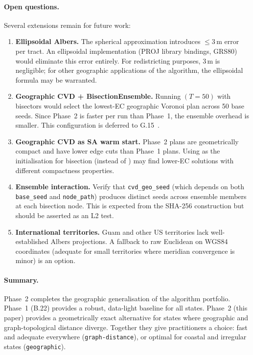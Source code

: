 \paragraph{Open questions.}
Several extensions remain for future work:

\begin{enumerate}
\item \textbf{Ellipsoidal Albers.}
  The spherical approximation introduces $\le 3$\,m error per tract.
  An ellipsoidal implementation (PROJ library bindings, GRS80) would
  eliminate this error entirely.
  For redistricting purposes, 3\,m is negligible; for other geographic
  applications of the algorithm, the ellipsoidal formula may be warranted.

\item \textbf{Geographic CVD + BisectionEnsemble.}
  Running \be{}$(T=50)$ with \cvdgeo{} bisectors would select the
  lowest-EC geographic Voronoi plan across 50 base seeds.
  Since Phase~2 is faster per run than Phase~1, the ensemble overhead
  is smaller.
  This configuration is deferred to G.15~\citep{dellaLibera2026comparison}.

\item \textbf{Geographic CVD as SA warm start.}
  Phase~2 plans are geometrically compact and have lower edge cuts than
  Phase~1 plans.
  Using \cvdgeo{} as the initialisation for \sa{} bisection
  (instead of \metis{}) may find lower-EC solutions with different
  compactness properties.

\item \textbf{Ensemble interaction.}
  Verify that \texttt{cvd\_geo\_seed} (which depends on both
  \texttt{base\_seed} and \texttt{node\_path}) produces distinct seeds
  across ensemble members at each bisection node.
  This is expected from the SHA-256 construction but should be asserted
  as an L2 test.

\item \textbf{International territories.}
  Guam and other US territories lack well-established Albers projections.
  A fallback to raw Euclidean on WGS84 coordinates (adequate for
  small territories where meridian convergence is minor) is an option.
\end{enumerate}

\paragraph{Summary.}
Phase~2 \cvdgeo{} completes the geographic generalisation of the \cvd{}
algorithm portfolio.
Phase~1 (B.22) provides a robust, data-light baseline for all states.
Phase~2 (this paper) provides a geometrically exact alternative for states
where geographic and graph-topological distance diverge.
Together they give practitioners a choice: fast and adequate everywhere
(\texttt{graph-distance}), or optimal for coastal and irregular states
(\texttt{geographic}).
